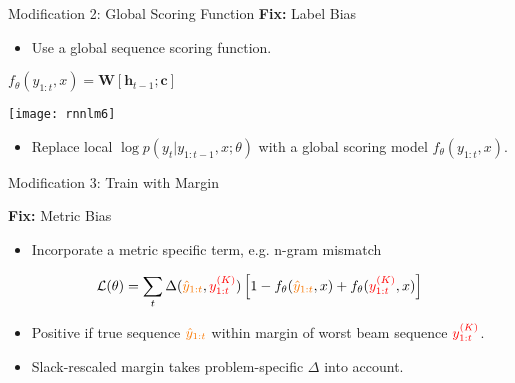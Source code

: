 \begin{frame}{Modification 2: Global Scoring Function  }
  \textbf{Fix:}  Label Bias
    \begin{itemize}
    \item Use a global sequence scoring function.
    \end{itemize}
    \pause


    \air

  \begin{center}
    $f_{\theta}(y_{1:t}, x)= \mathbf{W} [\mathbf{h}_{t-1}; \mathbf{c}]$

    \texttt{[image: rnnlm6]}
  \end{center}


  \begin{itemize}
  \item Replace local $ \log p(y_{t} | y_{1:t-1}, x; \theta)$ with
    a global scoring model $f_{\theta}(y_{1:t}, x)$.
  \end{itemize}
  \air


  
\end{frame}



\begin{frame}{Modification 3: Train with Margin}
  
  \textbf{Fix:} Metric Bias
  \begin{itemize}
  \item Incorporate a metric specific term, e.g. n-gram mismatch
  \end{itemize}
  \air
  \pause
  
  \[ \mathcal{L}(\theta) = \sum_{t} \Delta(\textcolor{gold}{\hat{y}_{1:t}}, \textcolor{red}{y_{1:t}^{(K)}}) \left[1 - f_{\theta}( \textcolor{gold}{\hat{y}_{1:t}}, x) +  f_{\theta}(\textcolor{red}{y_{1:t}^{(K)}}, x) \right] \]
  
  \begin{itemize}
  \item Positive if true sequence $\textcolor{gold}{\hat{y}_{1:t}}$ within margin of worst beam sequence $\textcolor{red}{y^{(K)}_{1:t}}$.
  \item Slack-rescaled margin takes problem-specific $\Delta$ into account.
  \end{itemize}
  
\end{frame}

